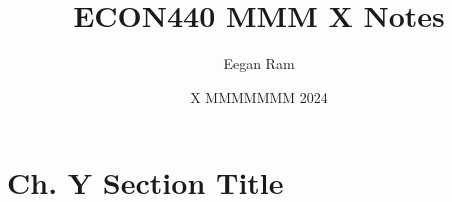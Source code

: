 \documentclass{scrartcl}
\title{ECON440 MMM X Notes}
\author{Eegan Ram}
\date{X MMMMMMM 2024}
\begin{document}
\maketitle

\section{Ch. Y Section Title}
\end{document}
